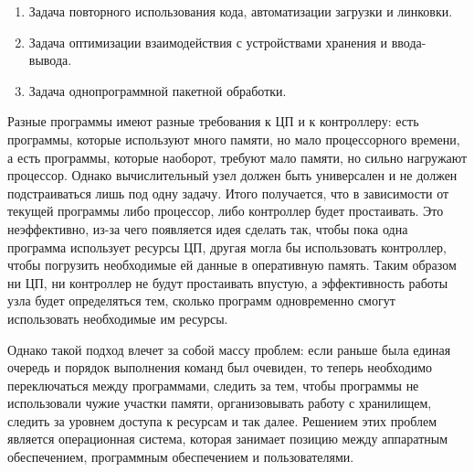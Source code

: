 \begin{enumerate}
\item
  Задача повторного использования кода, автоматизации загрузки и линковки.

\item
  Задача оптимизации взаимодействия с устройствами хранения и ввода-вывода.

\item
  Задача однопрограммной пакетной обработки.  
\end{enumerate}


Разные программы имеют разные требования к ЦП и к контроллеру: есть программы,
которые используют много памяти, но мало процессорного времени, а есть
программы, которые наоборот, требуют мало памяти, но сильно нагружают процессор.
Однако вычислительный узел должен быть универсален и не должен подстраиваться
лишь под одну задачу. Итого получается, что в зависимости от текущей программы
либо процессор, либо контроллер будет простаивать. Это неэффективно, из-за чего
появляется идея сделать так, чтобы пока одна программа использует ресурсы ЦП,
другая могла бы использовать контроллер, чтобы погрузить необходимые ей данные в
оперативную память. Таким образом ни ЦП, ни контроллер не будут простаивать
впустую, а эффективность работы узла будет определяться тем, сколько программ
одновременно смогут использовать необходимые им ресурсы.

Однако такой подход влечет за собой массу проблем: если раньше была единая
очередь и порядок выполнения команд был очевиден, то теперь необходимо
переключаться между программами, следить за тем, чтобы программы не использовали
чужие участки памяти, организовывать работу с хранилищем, следить за уровнем
доступа к ресурсам и так далее. Решением этих проблем является операционная
система, которая занимает позицию между аппаратным обеспечением, программным
обеспечением и пользователями.
